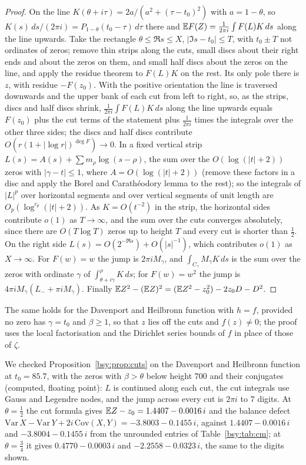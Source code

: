 \begin{proof}
On the line $K(\theta+i\tau)=2a/(a^2+(\tau-t_0)^2)$ with $a=1-\theta$, so $K(s)\,ds/(2\pi i)=P_{1-\theta}(t_0-\tau)\,d\tau$ there and $\mathbb{E} F(Z)=\frac1{2\pi i}\int F(L)K\,ds$ along the line upwards. Take the rectangle $\theta\le\Re s\le X$, $|\Im s-t_0|\le T$, with $t_0\pm T$ not ordinates of zeros; remove thin strips along the cuts, small discs about their right ends and about the zeros on them, and small half discs about the zeros on the line, and apply the residue theorem to $F(L)K$ on the rest. Its only pole there is $z$, with residue $-F(z_0)$. With the positive orientation the line is traversed downwards and the upper bank of each cut from left to right, so, as the strips, discs and half discs shrink, $\frac1{2\pi i}\int F(L)K\,ds$ along the line upwards equals $F(z_0)$ plus the cut terms of the statement plus $\frac1{2\pi i}$ times the integrals over the other three sides; the discs and half discs contribute $O(r(1+|\log r|)^{\deg F})\to0$. In a fixed vertical strip $L(s)=A(s)+\sum m_\rho\log(s-\rho)$, the sum over the $O(\log(|t|+2))$ zeros with $|\gamma-t|\le1$, where $A=O(\log(|t|+2))$ (remove these factors in a disc and apply the Borel and Carath\'eodory lemma to the rest); so the integrals of $|L|^p$ over horizontal segments and over vertical segments of unit length are $O_p(\log^{c_p}(|t|+2))$. As $K=O(t^{-2})$ in the strip, the horizontal sides contribute $o(1)$ as $T\to\infty$, and the sum over the cuts converges absolutely, since there are $O(T\log T)$ zeros up to height $T$ and every cut is shorter than $\frac12$. On the right side $L(s)=O(2^{-\Re s})+O(|s|^{-1})$, which contributes $o(1)$ as $X\to\infty$. For $F(w)=w$ the jump is $2\pi iM_\gamma$, and $\int_{C_\gamma}M_\gamma K\,ds$ is the sum over the zeros with ordinate $\gamma$ of $\int_{\theta+i\gamma}^{\rho}K\,ds$; for $F(w)=w^2$ the jump is $4\pi iM_\gamma(L_-+\pi iM_\gamma)$. Finally $\mathbb{E} Z^2-(\mathbb{E} Z)^2=(\mathbb{E} Z^2-z_0^2)-2z_0D-D^2$.
\end{proof}

The same holds for the Davenport and Heilbronn function with $h=f$, provided no zero has $\gamma=t_0$ and $\beta\ge1$, so that $z$ lies off the cuts and $f(z)\ne0$; the proof uses the local factorisation and the Dirichlet series bounds of $f$ in place of those of $\zeta$.

We checked Proposition~\ref{bsy:prop:cuts} on the Davenport and Heilbronn function at $t_0=85.7$, with the zeros with $\beta>\theta$ below height $700$ and their conjugates (computed, floating point): $L$ is continued along each cut, the cut integrals use Gauss and Legendre nodes, and the jump across every cut is $2\pi i$ to $7$ digits. At $\theta=\frac12$ the cut formula gives $\mathbb{E} Z-z_0=1.4407-0.0016\,i$ and the balance defect $\mathrm{Var}\,X-\mathrm{Var}\,Y+2i\,\mathrm{Cov}(X,Y)=-3.8003-0.1455\,i$, against $1.4407-0.0016\,i$ and $-3.8004-0.1455\,i$ from the unrounded entries of Table~\ref{bsy:tab:cm}; at $\theta=\frac34$ it gives $0.4770-0.0003\,i$ and $-2.2558-0.0323\,i$, the same to the digits shown.

